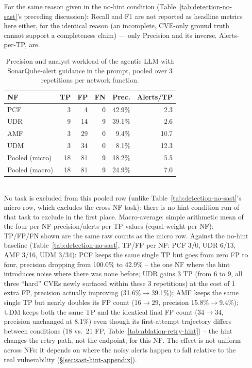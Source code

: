 
For the same reason given in the no-hint condition (Table~\ref{tab:detection-no-sast}'s
preceding discussion): Recall and F1 are not reported as headline metrics
here either, for the identical reason (an incomplete, CVE-only ground
truth cannot support a completeness claim) — only Precision and its
inverse, Alerts-per-TP, are.

\begin{table}[t]
\centering
\caption{Precision and analyst workload of the agentic LLM with SonarQube-alert guidance in the prompt, pooled over 3 repetitions per network function.}
\label{tab:detection-sast-hint}
\begin{tabular}{lrrrrr}
\toprule
NF & TP & FP & FN & Prec. & Alerts/TP \\
\midrule
PCF & 3  & 4  & 0 & 42.9\% & 2.3 \\
UDR & 9  & 14 & 9 & 39.1\% & 2.6 \\
AMF & 3  & 29 & 0 & 9.4\%  & 10.7 \\
UDM & 3  & 34 & 0 & 8.1\%  & 12.3 \\
\midrule
Pooled (micro) & 18 & 81 & 9 & 18.2\% & 5.5 \\
Pooled (macro) & 18 & 81 & 9 & 24.9\% & 7.0 \\
\bottomrule
\end{tabular}
\\[2pt]
\footnotesize{No task is excluded from this pooled row (unlike Table~\ref{tab:detection-no-sast}'s micro row, which excludes the cross-NF task): there is no hint-condition run of that task to exclude in the first place. Macro-average: simple arithmetic mean of the four per-NF precision/alerts-per-TP values (equal weight per NF); TP/FP/FN shown are the same raw counts as the micro row. Against the no-hint baseline (Table~\ref{tab:detection-no-sast}, TP/FP per NF: PCF 3/0, UDR 6/13, AMF 3/16, UDM 3/34): PCF keeps the same single TP but goes from zero FP to four, precision dropping from 100.0\% to 42.9\% -- the one NF where the hint introduces noise where there was none before; UDR gains 3 TP (from 6 to 9, all three ``hard'' CVEs newly surfaced within these 3 repetitions) at the cost of 1 extra FP, precision actually improving (31.6\%$\to$39.1\%); AMF keeps the same single TP but nearly doubles its FP count (16$\to$29, precision 15.8\%$\to$9.4\%); UDM keeps both the same TP and the identical final FP count (34$\to$34, precision unchanged at 8.1\%) even though its first-attempt trajectory differs between conditions (18 vs.\ 21 FP, Table~\ref{tab:ablation-retry-hint}) -- the hint changes the retry path, not the endpoint, for this NF. The effect is not uniform across NFs: it depends on where the noisy alerts happen to fall relative to the real vulnerability (\S\ref{sec:sast-hint-appendix}).}
\end{table}

